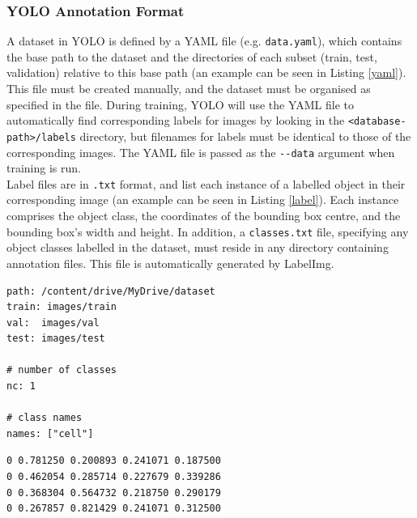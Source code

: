 \subsubsection{YOLO Annotation Format}
A dataset in YOLO is defined by a YAML file (e.g. \verb`data.yaml`), which contains the base path to the dataset and the directories of each subset (train, test, validation) relative to this base path (an example can be seen in Listing \ref{yaml}). This file must be created manually, and the dataset must be organised as specified in the file. During training, YOLO will use the YAML file to automatically find corresponding labels for images by looking in the \verb|<database-path>/labels| directory, but filenames for labels must be identical to those of the corresponding images. The YAML file is passed as the \verb|--data| argument when training is run.\\

Label files are in \verb|.txt| format, and list each instance of a labelled object in their corresponding image (an example can be seen in Listing \ref{label}). Each instance comprises the object class, the coordinates of the bounding box centre, and the bounding box's width and height. In addition, a \verb|classes.txt| file, specifying any object classes labelled in the dataset, must reside in any directory containing annotation files. This file is automatically generated by LabelImg.

\begin{lstlisting}[caption={YAML file for the project dataset}, label={yaml}]
path: /content/drive/MyDrive/dataset
train: images/train
val:  images/val
test: images/test

# number of classes
nc: 1

# class names
names: ["cell"]
\end{lstlisting}

\begin{lstlisting}[caption={An image annotation file in YOLO format. From left to right: object class; coordinates of bounding box centre; bounding box width and height}, label={label}]
0 0.781250 0.200893 0.241071 0.187500
0 0.462054 0.285714 0.227679 0.339286
0 0.368304 0.564732 0.218750 0.290179
0 0.267857 0.821429 0.241071 0.312500
\end{lstlisting}


